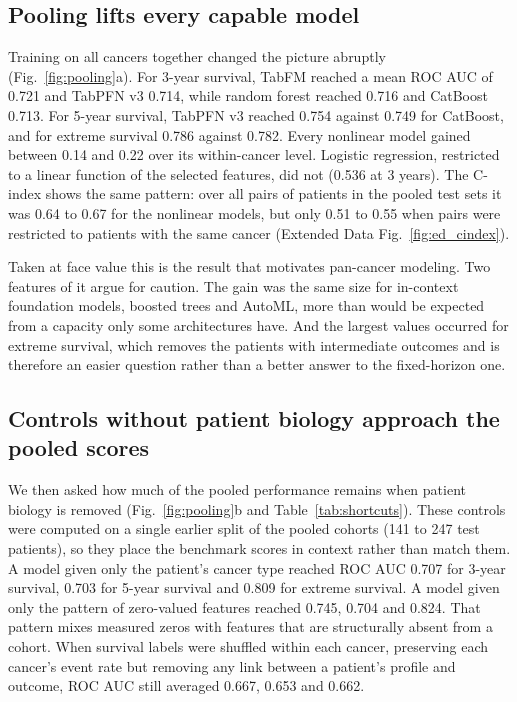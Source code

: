 \subsection*{Pooling lifts every capable model}

Training on all cancers together changed the picture abruptly (Fig.~\ref{fig:pooling}a). For 3-year survival, TabFM reached a mean ROC AUC of 0.721 and TabPFN v3 0.714, while random forest reached 0.716 and CatBoost 0.713. For 5-year survival, TabPFN v3 reached 0.754 against 0.749 for CatBoost, and for extreme survival 0.786 against 0.782. Every nonlinear model gained between 0.14 and 0.22 over its within-cancer level. Logistic regression, restricted to a linear function of the selected features, did not (0.536 at 3 years). The C-index shows the same pattern: over all pairs of patients in the pooled test sets it was 0.64 to 0.67 for the nonlinear models, but only 0.51 to 0.55 when pairs were restricted to patients with the same cancer (Extended Data Fig.~\ref{fig:ed_cindex}).

Taken at face value this is the result that motivates pan-cancer modeling. Two features of it argue for caution. The gain was the same size for in-context foundation models, boosted trees and AutoML, more than would be expected from a capacity only some architectures have. And the largest values occurred for extreme survival, which removes the patients with intermediate outcomes and is therefore an easier question rather than a better answer to the fixed-horizon one.

\begin{table}[ht]
\centering
\caption{Mean ROC AUC across frozen test sets. Within-cancer is the average of the three endpoint summaries, each itself averaged over cancers. NA, pooled 3-year training sets exceeded the 1,000-sample CPU limit of TabPFN v2--v2.6.}
\label{tab:model_auc}
\footnotesize\setlength{\tabcolsep}{3pt}
\end{table}

\subsection*{Controls without patient biology approach the pooled scores}

We then asked how much of the pooled performance remains when patient biology is removed (Fig.~\ref{fig:pooling}b and Table~\ref{tab:shortcuts}). These controls were computed on a single earlier split of the pooled cohorts (141 to 247 test patients), so they place the benchmark scores in context rather than match them. A model given only the patient's cancer type reached ROC AUC 0.707 for 3-year survival, 0.703 for 5-year survival and 0.809 for extreme survival. A model given only the pattern of zero-valued features reached 0.745, 0.704 and 0.824. That pattern mixes measured zeros with features that are structurally absent from a cohort. When survival labels were shuffled within each cancer, preserving each cancer's event rate but removing any link between a patient's profile and outcome, ROC AUC still averaged 0.667, 0.653 and 0.662.

